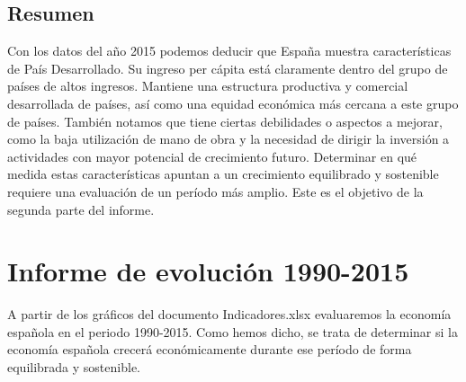     \subsection{Resumen}
    Con los datos del año 2015 podemos deducir que España muestra características de País Desarrollado. Su ingreso per cápita está claramente dentro del grupo de países de altos ingresos. Mantiene una estructura productiva y comercial desarrollada de países, así como una equidad económica más cercana a este grupo de países. También notamos que tiene ciertas debilidades o aspectos a mejorar, como la baja utilización de mano de obra y la necesidad de dirigir la inversión a actividades con mayor potencial de crecimiento futuro. Determinar en qué medida estas características apuntan a un crecimiento equilibrado y sostenible requiere una evaluación de un período más amplio. Este es el objetivo de la segunda parte del informe.

\section{Informe de evolución 1990-2015}
A partir de los gráficos del documento Indicadores.xlsx evaluaremos la economía española en el periodo 1990-2015. Como hemos dicho, se trata de determinar si la economía española crecerá económicamente durante ese período de forma equilibrada y sostenible.

